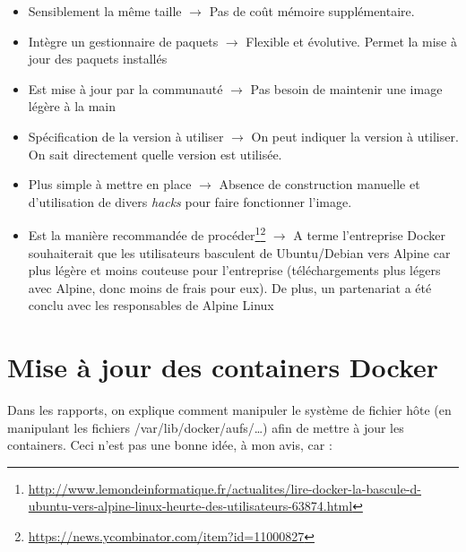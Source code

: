 \documentclass[11pt,a4paper,oneside]{report}
\begin{document}
\begin{itemize}
\item Sensiblement la même taille $\to$ Pas de coût mémoire supplémentaire.

\item Intègre un gestionnaire de paquets $\to$ Flexible et évolutive. Permet la mise à jour des paquets installés

\item Est mise à jour par la communauté $\to$ Pas besoin de maintenir une image légère à la main

\item Spécification de la version à utiliser $\to$ On peut indiquer la version à utiliser. On sait directement quelle version est utilisée.

\item Plus simple à mettre en place $\to$ Absence de construction manuelle et d'utilisation de divers \textit{hacks} pour faire fonctionner l'image.

\item Est la manière recommandée de procéder\footnote{\url{http://www.lemondeinformatique.fr/actualites/lire-docker-la-bascule-d-ubuntu-vers-alpine-linux-heurte-des-utilisateurs-63874.html}}\footnote{\url{https://news.ycombinator.com/item?id=11000827}} $\to$ A terme l'entreprise Docker souhaiterait que les utilisateurs basculent de Ubuntu/Debian vers Alpine car plus légère et moins couteuse pour l'entreprise (téléchargements plus légers avec Alpine, donc moins de frais pour eux). De plus, un partenariat a été conclu avec les responsables de Alpine Linux

\end{itemize}

\section{Mise à jour des containers Docker}
Dans les rapports, on explique comment manipuler le système de fichier hôte (en manipulant les fichiers /var/lib/docker/aufs/\ldots{}) afin de mettre à jour les containers. Ceci n'est pas une bonne idée, à mon avis, car :
\end{document}
